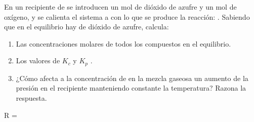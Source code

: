 \begin{exerciseEVAU}
    En un recipiente de  se introducen un mol de dióxido de azufre y un mol de oxígeno, y se calienta el sistema a  con lo que se produce la reacción: . Sabiendo que en el equilibrio hay  de dióxido de azufre, calcula:
    \begin{enumerate}[label=\letraminuscula]
\item Las concentraciones molares de todos los compuestos en el equilibrio.
\item Los valores de \(K_c\) y \(K_p\) .
\item ¿Cómo afecta a la concentración de  en la mezcla gaseosa un aumento de la presión en el recipiente manteniendo constante la temperatura? Razona la respuesta.
    \end{enumerate}
    \datos{} R = \ctegases


\end{exerciseEVAU}
